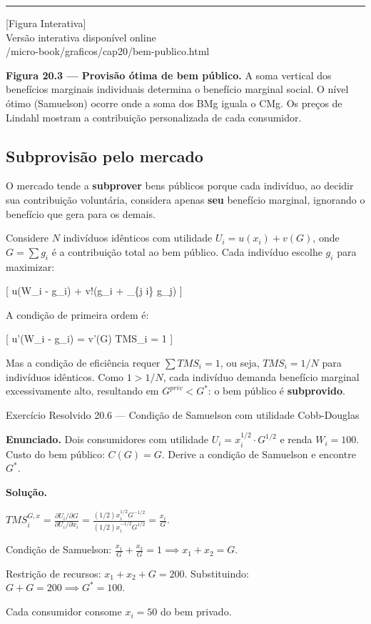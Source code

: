 \documentclass[11pt,twoside,openright]{book}
\newcommand{\figurePlaceholder}[1]{%
  \begin{center}
    \begin{tcolorbox}[
      width=0.85\textwidth,
      colback=graybg,
      colframe=gray,
      boxrule=0.5pt,
      arc=2pt,
      halign=center,
      valign=center,
      height=5cm
    ]
      \centering
      \vfill
      {\sffamily\color{gray}\large [Figura Interativa]}\\[6pt]
      {\sffamily\small\color{gray} Versão interativa disponível online}\\[4pt]
      {\ttfamily\tiny\color{gray} #1}
      \vfill
    \end{tcolorbox}
  \end{center}
}
\begin{document}
\begin{center}\rule{0.5\linewidth}{0.5pt}\end{center}

\figurePlaceholder{/micro-book/graficos/cap20/bem-publico.html}

\textbf{Figura 20.3 --- Provisão ótima de bem público.} A soma vertical
dos benefícios marginais individuais determina o benefício marginal
social. O nível ótimo (Samuelson) ocorre onde a soma dos BMg iguala o
CMg. Os preços de Lindahl mostram a contribuição personalizada de cada
consumidor.

\subsection{Subprovisão pelo mercado}\label{subprovisuxe3o-pelo-mercado}

O mercado tende a \textbf{subprover} bens públicos porque cada
indivíduo, ao decidir sua contribuição voluntária, considera apenas
\textbf{seu} benefício marginal, ignorando o benefício que gera para os
demais.

Considere \(N\) indivíduos idênticos com utilidade
\(U_i = u(x_i) + v(G)\), onde \(G = \sum g_i\) é a contribuição total ao
bem público. Cada indivíduo escolhe \(g_i\) para maximizar:

{[} u(W\_i - g\_i) + v!\left(g\_i + \sum\_\{j \neq i\} g\_j\right) {]}

A condição de primeira ordem é:

{[} u'(W\_i - g\_i) = v'(G) \implies TMS\_i = 1 \label{eq:20.12}
 {]}

Mas a condição de eficiência requer \(\sum TMS_i = 1\), ou seja,
\(TMS_i = 1/N\) para indivíduos idênticos. Como \(1 > 1/N\), cada
indivíduo demanda benefício marginal excessivamente alto, resultando em
\(G^{priv} < G^*\): o bem público é \textbf{subprovido}.

\begin{exresolvidobox}{Exercício Resolvido 20.6 — Condição de Samuelson com utilidade Cobb-Douglas}

\textbf{Enunciado.} Dois consumidores com utilidade
\(U_i = x_i^{1/2} \cdot G^{1/2}\) e renda \(W_i = 100\). Custo do bem
público: \(C(G) = G\). Derive a condição de Samuelson e encontre
\(G^*\).

\textbf{Solução.}

\(TMS_i^{G,x} = \frac{\partial U_i / \partial G}{\partial U_i / \partial x_i} = \frac{(1/2)x_i^{1/2} G^{-1/2}}{(1/2)x_i^{-1/2} G^{1/2}} = \frac{x_i}{G}\).

Condição de Samuelson:
\(\frac{x_1}{G} + \frac{x_2}{G} = 1 \implies x_1 + x_2 = G\).

Restrição de recursos: \(x_1 + x_2 + G = 200\). Substituindo:
\(G + G = 200 \implies G^* = 100\).

Cada consumidor consome \(x_i = 50\) do bem privado.

\end{exresolvidobox}
\end{document}
